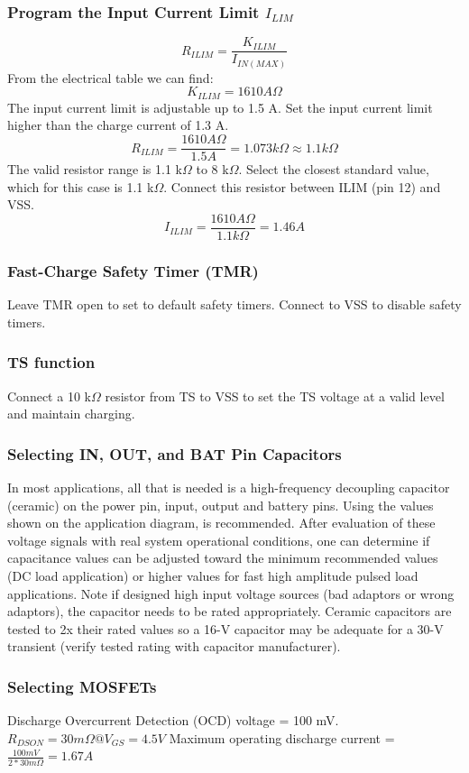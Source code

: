 \documentclass[11pt,a4paper]{article}
\begin{document}
\subsubsection{Program the Input Current Limit $I_{LIM}$}
\[ R_{ILIM} = \frac{K_{ILIM}}{I_{IN(MAX)}} \]
From the electrical table we can find:
\[ K_{ILIM} = 1610 A\Omega \]
The input current limit is adjustable up to 1.5 A. Set the input current limit higher than the charge current of 1.3 A.
\[ R_{ILIM} = \frac{1610 A\Omega}{1.5 A} = 1.073 k\Omega \approx 1.1 k\Omega  \]
The valid resistor range is 1.1 k$\Omega$ to 8 k$\Omega$. Select the closest standard value, which for this case is 1.1 k$\Omega$. Connect this resistor between ILIM (pin 12) and VSS.
\[ I_{ILIM} = \frac{1610 A\Omega}{1.1 k\Omega} = 1.46 A \]

\subsubsection{Fast-Charge Safety Timer (TMR)}
Leave TMR open to set to default safety timers. Connect to VSS to disable safety timers.

\subsubsection{TS function}
Connect a 10 k$\Omega$ resistor from TS to VSS to set the TS voltage at a valid level and maintain charging.

\subsubsection{Selecting IN, OUT, and BAT Pin Capacitors}
In most applications, all that is needed is a high-frequency decoupling capacitor (ceramic) on the power pin, input, output and battery pins. Using the values shown on the application diagram, is recommended. After evaluation of these voltage signals with real system operational conditions, one can determine if capacitance values can be adjusted toward the minimum recommended values (DC load application) or higher values for fast high amplitude pulsed load applications. Note if designed high input voltage sources (bad adaptors or wrong adaptors), the capacitor needs to be rated appropriately. Ceramic capacitors are tested to 2x their rated values so a 16-V capacitor may be adequate for a 30-V transient (verify tested rating with capacitor manufacturer).

\subsubsection{Selecting MOSFETs}
Discharge Overcurrent Detection (OCD) voltage = 100 mV. $R_{DSON} = 30 m\Omega @ V_{GS} = 4.5 V$
Maximum operating discharge current = $\frac{100 mV}{2*30 m\Omega} = 1.67 A$
\end{document}
